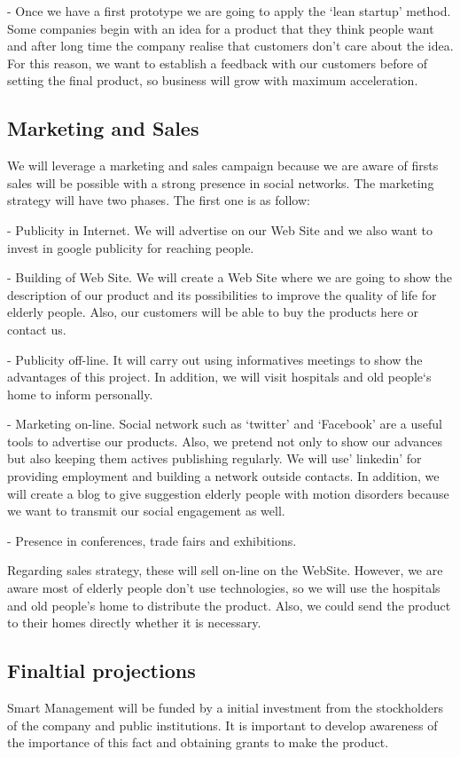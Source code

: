 -	Once we have a first prototype we are going to apply the ‘lean startup’ method. Some companies begin with an idea for a product that they think people want and after long time the company realise that customers don’t care about the idea. For this reason, we want to establish a feedback with our customers before of setting the final product, so  business will grow with maximum acceleration.


\subsection{Marketing and Sales}
We will leverage a marketing and sales campaign because we are aware of firsts sales will be possible with a strong presence in social networks. The marketing strategy will have two phases. The first one is as follow:

-	Publicity in Internet. We will advertise on our Web Site and we also want to invest in google publicity for reaching people.

-	Building of Web Site. We will create a Web Site where we are going to show the description of our product and its possibilities to improve the quality of life for elderly people. Also, our customers will be able to buy the products here or contact us.

-	Publicity off-line. It will carry out using informatives meetings to show the advantages of this project. In addition, we will visit hospitals and old people`s home to inform personally.

-	Marketing on-line. Social network such as ‘twitter’ and ‘Facebook’ are a useful tools to advertise our products. Also, we pretend not only to show our advances but also keeping them actives publishing regularly.
We will use’ linkedin’ for providing employment and building a network outside contacts.
In addition, we will create a blog to give suggestion elderly people with motion disorders because we want to transmit our social engagement as well.

-	Presence in conferences, trade fairs and exhibitions.

Regarding sales strategy, these will sell on-line on the WebSite. However, we are aware  most of elderly people don’t use technologies, so we will use the hospitals and old people’s home to distribute the product. Also, we could send the product to their homes directly whether it is necessary.


\subsection{Finaltial projections}
Smart Management will be funded by a initial investment from the stockholders of the company and public institutions. It is important to develop awareness of the importance of this fact and obtaining grants to make the product.


